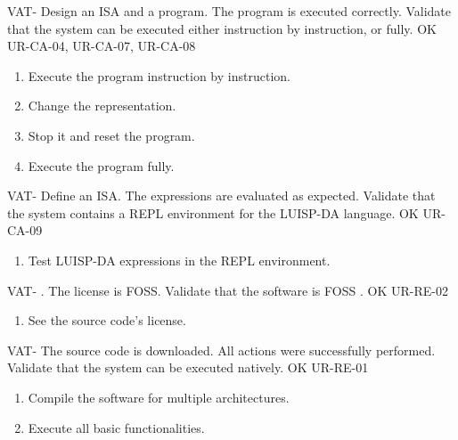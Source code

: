 \begin{testCase}{VAT-}
  {Design an \gls{ISA} and a program.}  %
  {The program is executed correctly.}  %
  {Validate that the system can be executed either instruction by instruction, or fully.}  %
  {OK}  %
  {UR-CA-04, UR-CA-07, UR-CA-08}  %
  \begin{enumerate}[leftmargin=*, topsep=0pt, noitemsep]  %
    \item Execute the program instruction by instruction.
    \item Change the representation.
    \item Stop it and reset the program.
    \item Execute the program fully.
  \end{enumerate}
\end{testCase}

\begin{testCase}{VAT-}
  {Define an \gls{ISA}.}  %
  {The expressions are evaluated as expected.}  %
  {Validate that the system contains a \gls{REPL environment} for the LUISP-DA language.}  %
  {OK}  %
  {UR-CA-09}  %
  \begin{enumerate}[leftmargin=*, topsep=0pt, noitemsep]  %
    \item Test LUISP-DA expressions in the \gls{REPL environment}.
  \end{enumerate}
\end{testCase}

\begin{testCase}{VAT-}
  {\NA.}  %
  {The license is \gls{FOSS}.}  %
  {Validate that the software is \gls{FOSS} .}  %
  {OK}  %
  {UR-RE-02}  %
  \begin{enumerate}[leftmargin=*, topsep=0pt, noitemsep]  %
    \item See the source code's license.
  \end{enumerate}
\end{testCase}

\begin{testCase}{VAT-}
  {The source code is downloaded.}  %
  {All actions were successfully performed.}  %
  {Validate that the system can be executed natively.}  %
  {OK}  %
  {UR-RE-01}  %
  \begin{enumerate}[leftmargin=*, topsep=0pt, noitemsep]  %
    \item Compile the software for multiple architectures.
    \item Execute all basic functionalities.
  \end{enumerate}
\end{testCase}

